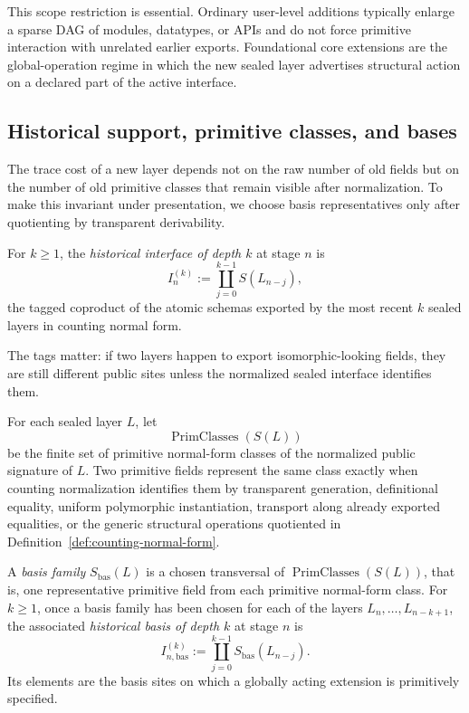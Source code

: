 \documentclass{lmcs}
\begin{document}
This scope restriction is essential.  Ordinary user-level additions typically enlarge a sparse
DAG of modules, datatypes, or APIs and do not force primitive interaction with unrelated
earlier exports.  Foundational core extensions are the global-operation regime in which the
new sealed layer advertises structural action on a declared part of the active interface.

\subsection{Historical support, primitive classes, and bases}

The trace cost of a new layer depends not on the raw number of old fields but on the number
of old primitive classes that remain visible after normalization.  To make this invariant under
presentation, we choose basis representatives only after quotienting by transparent
derivability.

\begin{defi}
For \(k\geq 1\), the \emph{historical interface of depth \(k\)} at stage \(n\) is
\[
  I_n^{(k)} := \coprod_{j=0}^{k-1} S(L_{n-j}),
\]
the tagged coproduct of the atomic schemas exported by the most recent \(k\) sealed layers
in counting normal form.
\end{defi}

The tags matter: if two layers happen to export isomorphic-looking fields, they are still
different public sites unless the normalized sealed interface identifies them.

\begin{defi}
\label{def:primitive-bases}
For each sealed layer \(L\), let
\[
  \operatorname{PrimClasses}(S(L))
\]
be the finite set of primitive normal-form classes of the normalized public signature of
\(L\).  Two primitive fields represent the same class exactly when counting normalization
identifies them by transparent generation, definitional equality, uniform polymorphic
instantiation, transport along already exported equalities, or the generic structural
operations quotiented in Definition~\ref{def:counting-normal-form}.

A \emph{basis family} \(S_{\mathrm{bas}}(L)\) is a chosen transversal of
\(\operatorname{PrimClasses}(S(L))\), that is, one representative primitive field from each
primitive normal-form class.  For \(k\geq 1\), once a basis family has been chosen for each of
the layers \(L_n,\ldots,L_{n-k+1}\), the associated \emph{historical basis of depth \(k\)} at
stage \(n\) is
\[
  I_{n,\mathrm{bas}}^{(k)} := \coprod_{j=0}^{k-1} S_{\mathrm{bas}}(L_{n-j}).
\]
Its elements are the basis sites on which a globally acting extension is primitively specified.
\end{defi}
\end{document}
